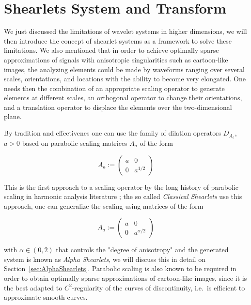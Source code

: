 \section{Shearlets System and Transform}
\label{sec:shearletsystem}

We just discussed the limitations of wavelet systems in higher dimensions, we will then introduce the concept of shearlet systems as a framework to solve these limitations. We also mentioned that in order to achieve optimally sparse approximations of signals with anisotropic singularities such as cartoon-like images, the analyzing elements could be made by waveforms ranging over several scales, orientations, and locations with the ability to become very elongated. One needs then the combination of an appropriate scaling operator to generate elements at different scales, an orthogonal operator to change their orientations, and a translation operator to displace the elements over the two-dimensional plane. 

\bigskip

By tradition and effectivenes one can use the family of dilation operators $D_{A_a}$, $a>0$ based on parabolic scaling matrices $A_a$ of the form

\begin{equation}
\label{eq:scaling}
A_a:=
\left(
\begin{matrix}
a & 0 \\
0 & a^{1/2}
\end{matrix}
\right)
\end{equation}

This is the first approach to a scaling operator by the long history of parabolic scaling in harmonic analysis literature \cite{Fefferman}; the so called \textit{Classical Shearlets} use this approach, one can generalize the scaling using matrices of the form 

\begin{equation}
\label{eq:scalingalpha}
A_a:=
\left(
\begin{matrix}
a & 0 \\
0 & a^{\alpha/2}
\end{matrix}
\right)
\end{equation}

with $\alpha\in (0,2)$ that controls the "degree of anisotropy" and the generated system is known as \textit{Alpha Shearlets}, we will discuss this in detail on Section~\ref{sec:AlphaShearlets}. Parabolic scaling is also known to be required in order to obtain optimally sparse approximations of cartoon-like images, since it is the best adapted to $C^2$-regularity of the curves of discontinuity, i.e.\ is efficient to approximate smooth curves.

